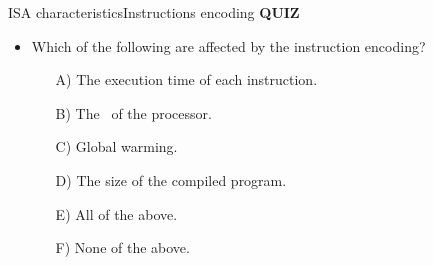 %

\begin{frame}{\acs{ISA} characteristics}{Instructions encoding}
  \textbf{\large{QUIZ}} \\
  \begin{itemize}
    \item Which of the following are affected by the instruction encoding?
    \begin{enumerate}
      \item[A)] The execution time of each instruction.
      \item[B)] The \uA~of the processor.
      \item[C)] Global warming.
      \item[D)] The size of the compiled program.
      \item[E)] All of the above.
      \item[F)] None of the above.
    \end{enumerate}   
  \end{itemize}
\end{frame}


